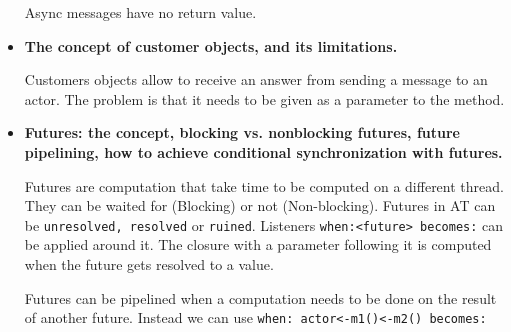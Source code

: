 \documentclass[a4paper]{report}
\begin{document}
\begin{itemize}
  Async messages have no return value.
  \item\textbf{ The concept of customer objects, and its limitations.}

  Customers objects allow to receive an answer from sending a message to an actor. The problem is that it needs to be given as a parameter to the method.
  \item\textbf{ Futures: the concept, blocking vs. nonblocking futures, future pipelining, how to achieve conditional synchronization with futures.}

  Futures are computation that take time to be computed on a different thread. They can be waited for (Blocking) or not (Non-blocking). Futures in AT can be \texttt{unresolved, resolved} or \texttt{ruined}. Listeners \texttt{when:<future> becomes:} can be applied around it. The closure with a parameter following it is computed when the future gets resolved to a value.

  Futures can be pipelined when a computation needs to be done on the result of another future. Instead we can use \texttt{when: actor<-m1()<-m2() becomes:}
\end{itemize}


\end{document}
